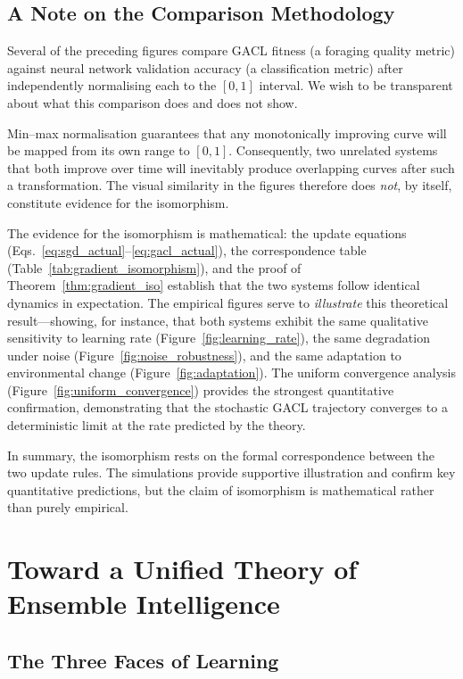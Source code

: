 \documentclass[12pt,letterpaper]{article}
\begin{document}
\subsection{A Note on the Comparison Methodology}

Several of the preceding figures compare GACL fitness (a foraging quality metric) against neural network validation accuracy (a classification metric) after independently normalising each to the $[0,1]$ interval.  We wish to be transparent about what this comparison does and does not show.

Min--max normalisation guarantees that any monotonically improving curve will be mapped from its own range to $[0,1]$.  Consequently, two unrelated systems that both improve over time will inevitably produce overlapping curves after such a transformation.  The visual similarity in the figures therefore does \emph{not}, by itself, constitute evidence for the isomorphism.

The evidence for the isomorphism is mathematical: the update equations (Eqs.~\ref{eq:sgd_actual}--\ref{eq:gacl_actual}), the correspondence table (Table~\ref{tab:gradient_isomorphism}), and the proof of Theorem~\ref{thm:gradient_iso} establish that the two systems follow identical dynamics in expectation.  The empirical figures serve to \emph{illustrate} this theoretical result---showing, for instance, that both systems exhibit the same qualitative sensitivity to learning rate (Figure~\ref{fig:learning_rate}), the same degradation under noise (Figure~\ref{fig:noise_robustness}), and the same adaptation to environmental change (Figure~\ref{fig:adaptation}).  The uniform convergence analysis (Figure~\ref{fig:uniform_convergence}) provides the strongest quantitative confirmation, demonstrating that the stochastic GACL trajectory converges to a deterministic limit at the rate predicted by the theory.

In summary, the isomorphism rests on the formal correspondence between the two update rules.  The simulations provide supportive illustration and confirm key quantitative predictions, but the claim of isomorphism is mathematical rather than purely empirical.

\section{Toward a Unified Theory of Ensemble Intelligence}

\subsection{The Three Faces of Learning}
\end{document}
